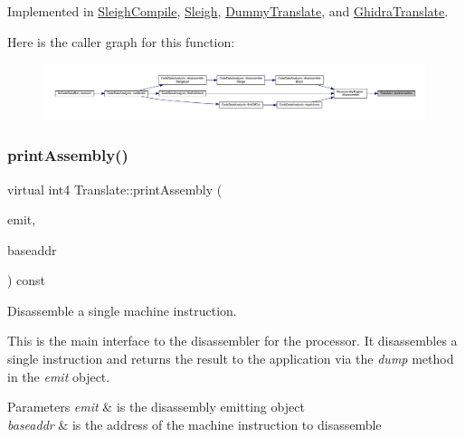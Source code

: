 Implemented in \mbox{\hyperlink{class_sleigh_compile_acdc475de0a5d086c9d256f28c2f6862d}{Sleigh\+Compile}}, \mbox{\hyperlink{class_sleigh_a7221a746dae0e1acfd2189a192974fe0}{Sleigh}}, \mbox{\hyperlink{class_dummy_translate_a429150e7328be97b17b7ee7211c23841}{Dummy\+Translate}}, and \mbox{\hyperlink{class_ghidra_translate_aa78b3ea805b2fb69c7e4dc9e7d8f32ee}{Ghidra\+Translate}}.

Here is the caller graph for this function\+:
\nopagebreak
\begin{figure}[H]
\begin{center}
\leavevmode
\includegraphics[width=350pt]{class_translate_a1737782c38ee43de62ae2e7572321fc9_icgraph}
\end{center}
\end{figure}
\mbox{\label{class_translate_ac97443bb89e0c6bfb68caf9f48a8c85d}} 
\subsubsection{\texorpdfstring{printAssembly()}{printAssembly()}}
{\footnotesize\ttfamily virtual int4 Translate\+::print\+Assembly (\begin{DoxyParamCaption}\item[{\mbox{\hyperlink{class_assembly_emit}{Assembly\+Emit}} \&}]{emit,  }\item[{const \mbox{\hyperlink{class_address}{Address}} \&}]{baseaddr }\end{DoxyParamCaption}) const\hspace{0.3cm}{\ttfamily [pure virtual]}}



Disassemble a single machine instruction. 

This is the main interface to the disassembler for the processor. It disassembles a single instruction and returns the result to the application via the {\itshape dump} method in the {\itshape emit} object. 
\begin{DoxyParams}{Parameters}
{\em emit} & is the disassembly emitting object \\
\hline
{\em baseaddr} & is the address of the machine instruction to disassemble \\
\hline
\end{DoxyParams}


